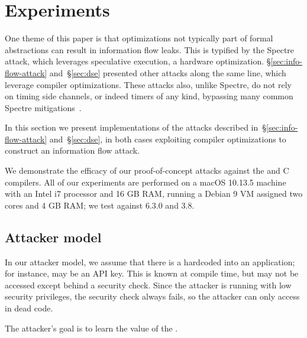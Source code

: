 \section{Experiments}
\label{sec:experiments}

One theme of this paper is that optimizations not typically part of formal
abstractions can result in information flow leaks.
This is typified by the Spectre attack, which leverages speculative execution,
a hardware optimization.
\S\ref{sec:info-flow-attack} and~\S\ref{sec:dse} presented other attacks
along the same line, which leverage compiler optimizations.
These attacks also, unlike Spectre, do not rely on timing side channels, or
indeed timers of any kind, bypassing many common Spectre
mitigations~\cite{KohlbrennerShacham2016, FirefoxPerformanceNow}.

In this section we present implementations of the attacks described
in~\S\ref{sec:info-flow-attack} and~\S\ref{sec:dse}, in both cases
exploiting compiler optimizations to construct an information flow attack.
We demonstrate the efficacy of our proof-of-concept attacks against
the {\CLANG} and {\GCC} C compilers.
All of our experiments are performed on a macOS 10.13.5 machine with an Intel
i7 processor and 16 GB RAM, running a Debian 9 VM assigned two cores
and 4 GB RAM; we test against {\GCC} 6.3.0 and {\CLANG} 3.8.

\subsection{Attacker model}
\label{subsec:attacker-model}

In our attacker model, we assume that there is a {\SEC} hardcoded into an
application; for instance, {\SEC} may be an API key.
This {\SEC} is known at compile time, but may not be
accessed except behind a security check.
Since the attacker is running with low security privileges,
the security check always fails,
so the attacker can only access {\SEC} in dead code.
The attacker's goal is to learn the value of the {\SEC}.

